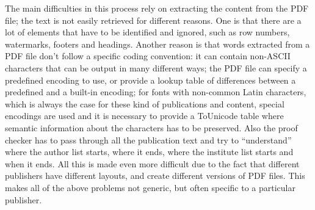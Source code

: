 The main difficulties in this process rely on extracting the content from the PDF file; the text is not easily retrieved for different reasons.
One is that there are a lot of elements that have to be identified and ignored, such as row numbers, watermarks, footers and headings.
Another reason is that words extracted from a PDF file don't follow a specific coding convention:
it can contain non-ASCII characters that can be output in many different ways;
the PDF file can specify a predefined encoding to use, or provide a lookup table of differences between a predefined and a built-in encoding;
for fonts with non-common Latin characters, which is always the case for these kind of publications and content,
special encodings are used and it is necessary to provide a ToUnicode table where semantic information about the characters has to be preserved.
Also the proof checker has to pass through all the publication text and try to \enquote{understand} where the author list starts, where it ends, where the institute list starts and when it ends.
All this is made even more difficult due to the fact that different publishers have different layouts, and create different versions of PDF files.
This makes all of the above problems not generic,
but often specific to a particular publisher.

